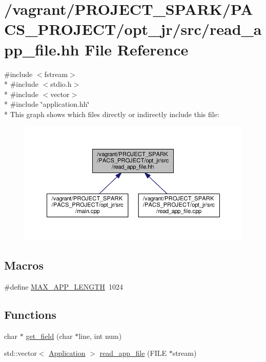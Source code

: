 \hypertarget{read__app__file_8hh}{\section{/vagrant/\-P\-R\-O\-J\-E\-C\-T\-\_\-\-S\-P\-A\-R\-K/\-P\-A\-C\-S\-\_\-\-P\-R\-O\-J\-E\-C\-T/opt\-\_\-jr/src/read\-\_\-app\-\_\-file.hh File Reference}
\label{read__app__file_8hh}
}
{\ttfamily \#include $<$fstream$>$}\\*
{\ttfamily \#include $<$stdio.\-h$>$}\\*
{\ttfamily \#include $<$vector$>$}\\*
{\ttfamily \#include \char`\"{}application.\-hh\char`\"{}}\\*
This graph shows which files directly or indirectly include this file\-:\nopagebreak
\begin{figure}[H]
\begin{center}
\leavevmode
\includegraphics[width=350pt]{read__app__file_8hh__dep__incl}
\end{center}
\end{figure}
\subsection*{Macros}
\begin{DoxyCompactItemize}
\item 
\#define \hyperlink{read__app__file_8hh_a7ed282204b454e197643642cd5168211}{M\-A\-X\-\_\-\-A\-P\-P\-\_\-\-L\-E\-N\-G\-T\-H}~1024
\end{DoxyCompactItemize}
\subsection*{Functions}
\begin{DoxyCompactItemize}
\item 
char $\ast$ \hyperlink{read__app__file_8hh_a83fa4dd89935ed1f044f0a3dec2677d8}{get\-\_\-field} (char $\ast$line, int num)
\item 
std\-::vector$<$ \hyperlink{classApplication}{Application} $>$ \hyperlink{read__app__file_8hh_abea28f70a4f365abefd8b7aa3f0aa00e}{read\-\_\-app\-\_\-file} (F\-I\-L\-E $\ast$stream)
\end{DoxyCompactItemize}
